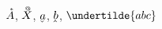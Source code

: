 $\accentset{*}{A}$, $\accentset{@}{X}$,
$\underaccent{\check}{a}$,
$\underaccent{\hat}{b}$,
$\undertilde{abc}$
